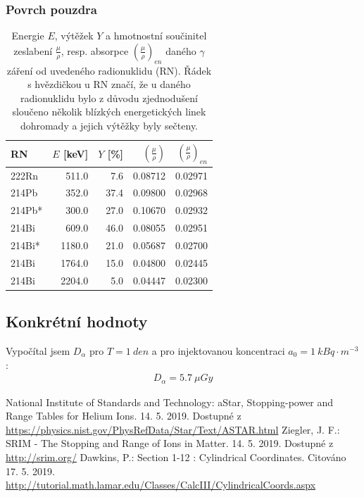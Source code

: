 \documentclass[11pt,a4paper]{article}
\begin{document}
\subsubsection{Povrch pouzdra}
\begin{table}[ht]
	\centering
	\caption{Energie $E$, výtěžek $Y$ a hmotnostní součinitel zeslabení $\frac{\mu}{\rho}$, resp. absorpce $\left(\frac{\mu}{\rho}\right)_{en}$ daného $\gamma$ záření od uvedeného radionuklidu (RN). Řádek s hvězdičkou u RN značí, že u daného radionuklidu bylo z důvodu zjednodušení sloučeno několik blízkých energetických linek dohromady a jejich výtěžky byly sečteny.}
	\label{tab:gamy}
	\begin{tabular}{lrrrr}
		\toprule	 
		RN &  $E$ [keV] &  $Y$ [\%] &       $\left(\frac{\mu}{\rho}\right)$ &    $\left(\frac{\mu}{\rho}\right)_{en}$ \\
		\midrule
		222Rn  &   511.0 &  7.6 &  0.08712 &  0.02971 \\
		214Pb  &   352.0 &  37.4 &  0.09800 &  0.02968 \\
		214Pb* &   300.0 &  27.0 &  0.10670 &  0.02932 \\
		214Bi  &   609.0 &  46.0 &  0.08055 &  0.02951 \\
		214Bi* &  1180.0 &  21.0 &  0.05687 &  0.02700 \\
		214Bi  &  1764.0 &  15.0 &  0.04800 &  0.02445 \\
		214Bi  &  2204.0 &  5.0 &  0.04447 &  0.02300 \\
		\bottomrule
	\end{tabular}
\end{table}
\subsection{Konkrétní hodnoty}
Vypočítal jsem $D_{\alpha}$ pro $T=\SI{1}{den}$ a pro injektovanou koncentraci $a_0=\SI{1}{kBq\cdot m^{-3}}$:
\begin{align}
	D_{\alpha}=\SI{5.7}{\mu Gy}
\end{align}
\begin{thebibliography}{Mm99}
	 National Institute of Standards and Technology: aStar, Stopping-power and Range Tables for Helium Ions. 14. 5. 2019. Dostupné z \url{https://physics.nist.gov/PhysRefData/Star/Text/ASTAR.html}
	 Ziegler, J. F.: SRIM - The Stopping and Range of Ions in Matter. 14. 5. 2019. Dostupné z \url{http://srim.org/} 
	 Dawkins, P.: Section 1-12 : Cylindrical Coordinates. Citováno 17. 5. 2019. \url{http://tutorial.math.lamar.edu/Classes/CalcIII/CylindricalCoords.aspx}
\end{thebibliography}
\end{document}

